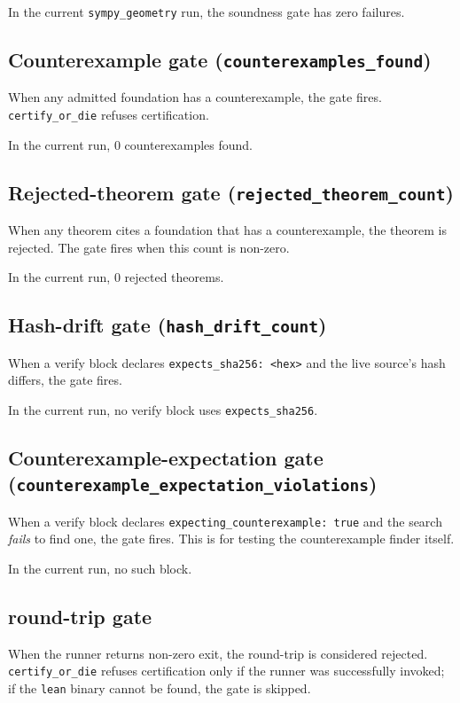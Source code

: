 In the current \texttt{sympy\_geometry} run, the soundness gate has
zero failures.

\subsection{Counterexample gate (\texttt{counterexamples\_found})}

When any admitted foundation has a counterexample, the gate fires.
\texttt{certify\_or\_die} refuses certification.

In the current run, 0 counterexamples found.

\subsection{Rejected-theorem gate (\texttt{rejected\_theorem\_count})}

When any theorem cites a foundation that has a counterexample,
the theorem is rejected.  The gate fires when this count is non-zero.

In the current run, 0 rejected theorems.

\subsection{Hash-drift gate (\texttt{hash\_drift\_count})}

When a verify block declares \texttt{expects\_sha256: <hex>} and
the live source's hash differs, the gate fires.

In the current run, no verify block uses \texttt{expects\_sha256}.

\subsection{Counterexample-expectation gate
(\texttt{counterexample\_expectation\_violations})}

When a verify block declares
\texttt{expecting\_counterexample: true} and the search
\emph{fails} to find one, the gate fires.  This is for testing
the counterexample finder itself.

In the current run, no such block.

\subsection{\Lean{} round-trip gate}

When the \Lean{} runner returns non-zero exit, the round-trip is
considered rejected.  \texttt{certify\_or\_die} refuses
certification only if the runner was successfully invoked; if the
\texttt{lean} binary cannot be found, the gate is skipped.

